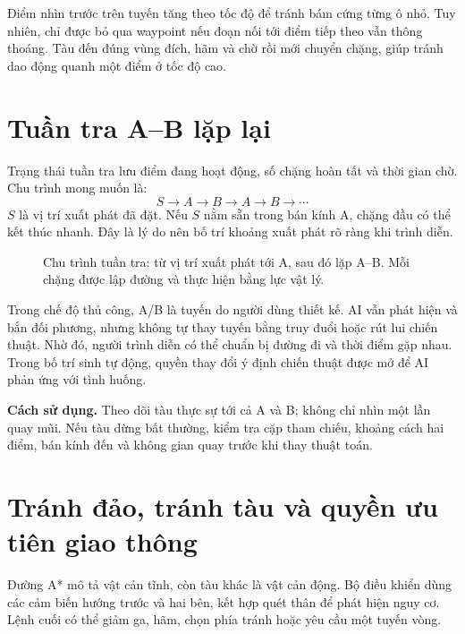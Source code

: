 \documentclass[11pt,a4paper,oneside]{report}
\newcommand{\howto}[1]{\par\smallskip\noindent\textbf{Cách sử dụng.} #1\par}
\begin{document}
Điểm nhìn trước trên tuyến tăng theo tốc độ để tránh bám cứng từng ô nhỏ. Tuy nhiên, chỉ được bỏ qua waypoint nếu đoạn nối tới điểm tiếp theo vẫn thông thoáng. Tàu đến đúng vùng đích, hãm và chờ rồi mới chuyển chặng, giúp tránh dao động quanh một điểm ở tốc độ cao.

\section{Tuần tra A--B lặp lại}
Trạng thái tuần tra lưu điểm đang hoạt động, số chặng hoàn tất và thời gian chờ. Chu trình mong muốn là:
\[
 S\longrightarrow A\longrightarrow B\longrightarrow A\longrightarrow B\longrightarrow\cdots
\]
$S$ là vị trí xuất phát đã đặt. Nếu $S$ nằm sẵn trong bán kính A, chặng đầu có thể kết thúc nhanh. Đây là lý do nên bố trí khoảng xuất phát rõ ràng khi trình diễn.

\begin{figure}[H]\centering
{}
\caption{Chu trình tuần tra: từ vị trí xuất phát tới A, sau đó lặp A--B. Mỗi chặng được lập đường và thực hiện bằng lực vật lý.}\label{fig:routes}
\end{figure}

Trong chế độ thủ công, A/B là tuyến do người dùng thiết kế. AI vẫn phát hiện và bắn đối phương, nhưng không tự thay tuyến bằng truy đuổi hoặc rút lui chiến thuật. Nhờ đó, người trình diễn có thể chuẩn bị đường đi và thời điểm gặp nhau. Trong bố trí sinh tự động, quyền thay đổi ý định chiến thuật được mở để AI phản ứng với tình huống.
\howto{Theo dõi tàu thực sự tới cả A và B; không chỉ nhìn một lần quay mũi. Nếu tàu dừng bất thường, kiểm tra cặp tham chiếu, khoảng cách hai điểm, bán kính đến và không gian quay trước khi thay thuật toán.}

\section{Tránh đảo, tránh tàu và quyền ưu tiên giao thông}
Đường A* mô tả vật cản tĩnh, còn tàu khác là vật cản động. Bộ điều khiển dùng các cảm biến hướng trước và hai bên, kết hợp quét thân để phát hiện nguy cơ. Lệnh cuối có thể giảm ga, hãm, chọn phía tránh hoặc yêu cầu một tuyến vòng.
\end{document}
